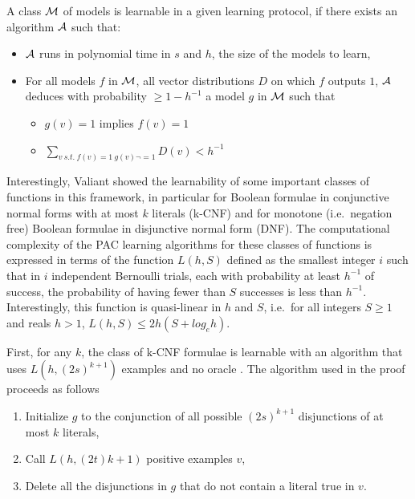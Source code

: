 \documentclass{llncs}
\begin{document}
A class $\cal M$ of models is learnable in a given learning protocol, if there exists an algorithm $\cal A$ such that:
\begin{itemize}
  \item
$\cal A$ runs in polynomial time in $s$ and $h$, the size of the models to learn,
  \item
For all models $f$ in $\cal M$,
all vector distributions $D$ on which $f$ outputs $1$,
$\cal A$ deduces with probability $\ge 1-h^{-1}$ a model $g$ in $\cal M$ such that
\begin{itemize}
  \item
$g(v)=1$ implies $f(v)=1$
\item
$\sum_{v\ s.t.~f(v)=1\ g(v)\neg=1} D(v) < h^{-1}$
\end{itemize}
\end{itemize}


Interestingly, Valiant showed the learnability of some important classes of functions in this framework,
in particular for Boolean formulae in conjunctive normal forms with at most $k$ literals (k-CNF)
and for monotone (i.e.~negation free) Boolean formulae in disjunctive normal form (DNF).
The computational complexity of the PAC learning algorithms for these classes of functions is expressed in terms of the function
$L(h,S)$ defined as the smallest integer $i$ such that
in $i$ independent Bernoulli trials, each with probability at least $h^{-1}$ of success, the probability of having fewer than $S$ successes is less than $h^{-1}$.
Interestingly, this function is quasi-linear in $h$ and $S$, i.e.~for all integers $S\ge 1$ and reals $h>1$, $L(h,S) \le 2h(S+log_eh)$.

First, for any $k$, the class of k-CNF formulae is learnable with an
algorithm that uses $L(h,(2s)^{k+1})$ examples and no oracle \cite{Valiant84cacm}.
The algorithm used in the proof proceeds as follows
\begin{enumerate}
  \item Initialize $g$ to the conjunction of all possible $(2s)^{k+1}$ disjunctions of at most $k$ literals,
\item Call $L(h,(2t)k+1)$ positive examples $v$,
\item Delete all the disjunctions in $g$ that do not contain a literal true in $v$.
\end{enumerate}
\end{document}
